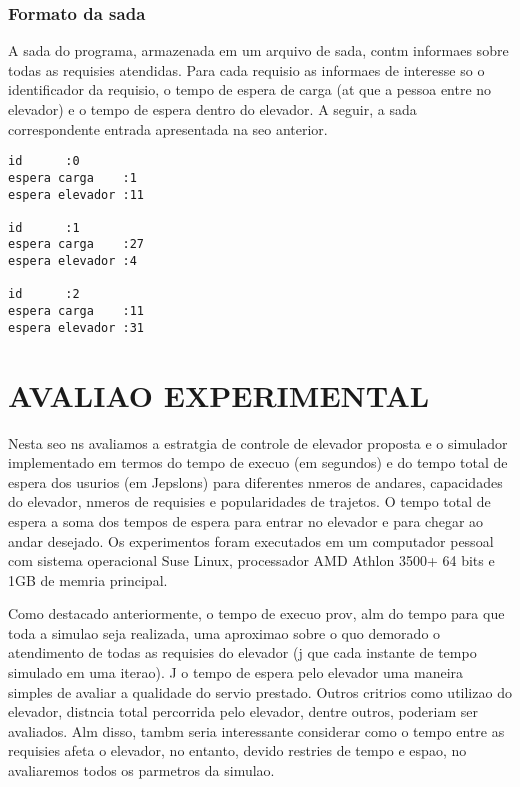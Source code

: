 \documentclass[12pt]{article}
\begin{document}
\subsubsection{Formato da sada}

A sada do programa, armazenada em um arquivo de sada, contm informaes sobre todas as requisies atendidas.  Para cada requisio as informaes de interesse so o identificador da requisio, o tempo de espera de carga (at que a pessoa entre no elevador) e o tempo de espera dentro do elevador. A seguir, a sada correspondente  entrada apresentada na seo anterior.

\begin{footnotesize}
\begin{verbatim}
id		:0
espera carga	:1
espera elevador	:11

id		:1
espera carga	:27
espera elevador	:4

id		:2
espera carga	:11
espera elevador	:31
\end{verbatim}
\end{footnotesize}


\section{AVALIAO EXPERIMENTAL}
\label{avaliacao_experimental}

Nesta seo ns avaliamos a estratgia de controle de elevador proposta e o simulador implementado em termos do tempo de execuo (em segundos) e do tempo total de espera dos usurios (em Jepslons) para diferentes nmeros de andares, capacidades do elevador, nmeros de requisies e popularidades de trajetos. O tempo total de espera  a soma dos tempos de espera para entrar no elevador e para chegar ao andar desejado. Os experimentos foram executados em um computador pessoal com sistema operacional Suse Linux, processador AMD Athlon 3500+ 64 bits e 1GB de memria principal.

Como destacado anteriormente, o tempo de execuo prov, alm do tempo para que toda a simulao seja realizada, uma aproximao sobre o quo demorado  o atendimento de todas as requisies do elevador (j que cada instante de tempo  simulado em uma iterao). J o tempo de espera pelo elevador  uma maneira simples de avaliar a qualidade do servio prestado. Outros critrios como utilizao do elevador, distncia total percorrida pelo elevador, dentre outros, poderiam ser avaliados. Alm disso, tambm seria interessante considerar como o tempo entre as requisies afeta o elevador, no entanto, devido  restries de tempo e espao, no avaliaremos todos os parmetros da simulao.
\end{document}
